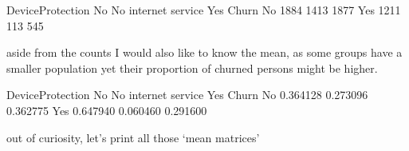 \documentclass[letterpaper,10pt,english]{jupyterBook}
\begin{document}
\begin{sphinxVerbatim}[commandchars=\\\{\}]
DeviceProtection    No  No internet service   Yes
Churn                                            
No                1884                 1413  1877
Yes               1211                  113   545
\end{sphinxVerbatim}

\sphinxAtStartPar
aside from the counts I would also like to know the mean, as some groups have a smaller population yet their proportion of churned persons might be higher.

\begin{sphinxVerbatim}[commandchars=\\\{\}]
 
    \PYG{p}{[} \PYG{p}{]}
   
\end{sphinxVerbatim}

\begin{sphinxVerbatim}[commandchars=\\\{\}]
\end{sphinxVerbatim}

\begin{sphinxVerbatim}[commandchars=\\\{\}]
DeviceProtection        No  No internet service       Yes
Churn                                                    
No                0.364128             0.273096  0.362775
Yes               0.647940             0.060460  0.291600
\end{sphinxVerbatim}

\sphinxAtStartPar
out of curiosity, let’s print all those ‘mean matrices’

\begin{sphinxVerbatim}[commandchars=\\\{\}]
   
\end{sphinxVerbatim}
\end{document}
